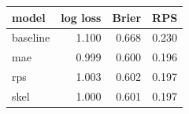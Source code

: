 
\begin{tabular}{lrrr}
\toprule
model & log loss & Brier & RPS\\
\midrule
baseline & 1.100 & 0.668 & 0.230\\
mae & 0.999 & 0.600 & 0.196\\
rps & 1.003 & 0.602 & 0.197\\
skel & 1.000 & 0.601 & 0.197\\
\bottomrule
\end{tabular}
